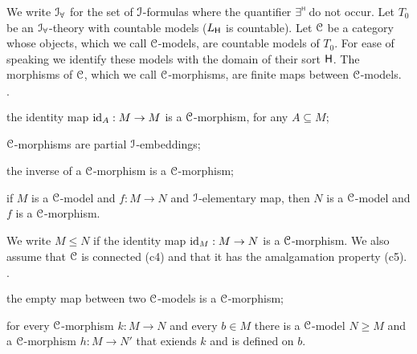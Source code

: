 \documentclass[10pt,oneside]{amsproc}
\newcommand{\mylabel}[1]{{#1}\hfill}
\renewenvironment{itemize}
  {\begin{list}{$\cdot$}{%
  \setlength{\parskip}{0mm}
  \setlength{\topsep}{.4\baselineskip}
  \setlength{\rightmargin}{0mm}
  \setlength{\listparindent}{0mm}
  \setlength{\itemindent}{0mm}
  \setlength{\labelwidth}{3ex}
  \setlength{\itemsep}{.2\baselineskip}
  \setlength{\parsep}{.2\baselineskip}
  \setlength{\partopsep}{0mm}
  \setlength{\labelsep}{1ex}
  \setlength{\leftmargin}{\labelwidth+\labelsep}
  \let\makelabel\mylabel}}{%
\end{list}}
\begin{document}
We write ${\EuScript I}_\forall$ for the set of ${\EuScript I}$-formulas where the quantifier $\exists\raisebox{1.1ex}{\scaleto{\sf H}{.8ex}\kern-.2ex}$ do not occur.
Let $T_0$ be an ${\EuScript I}_\forall$-theory with countable models ($L_{\sf H}$ is countable).
Let ${\EuScript C}$ be a category whose objects, which we call ${\EuScript C}$-models, are countable models of $T_0$.
For ease of speaking we identify these models with the domain of their sort ${\sf H}$.
The morphisms of ${\EuScript C}$, which we call  ${\EuScript C}$-morphisms, are finite maps between ${\EuScript C}$-models.

\begin{itemize} 
  \item[c1.] the identity map ${\rm id}_A:M\to M$ is a ${\EuScript C}$-morphism, for any $A\subseteq M$;
  \item[c2.]  ${\EuScript C}$-morphisms are partial ${\EuScript I}$-embeddings;
  \item[c3.]  the inverse of a ${\EuScript C}$-morphism is a  ${\EuScript C}$-morphism;
  \item[c3.] if $M$ is a ${\EuScript C}$-model and $f:M\to N$ and  ${\EuScript I}$-elementary map, then $N$ is a ${\EuScript C}$-model and $f$ is a  ${\EuScript C}$-morphism.
\end{itemize}

We write $M\le N$ if the identity map ${\rm id}_M:M\to N$ is a ${\EuScript C}$-morphism.
We also assume that ${\EuScript C}$ is connected (c4) and that it has the amalgamation property (c5).

\begin{itemize} 
  \item[c4.] the empty map between two ${\EuScript C}$-models is a ${\EuScript C}$-morphism;
  \item[c5.] for every ${\EuScript C}$-morphism $k:M\to N$ and every $b\in M$ there is a ${\EuScript C}$-model $N\ge M$ and a ${\EuScript C}$-morphism $h:M\to N'$ that exiends $k$ and is defined on $b$.
\end{itemize}
\end{document}
